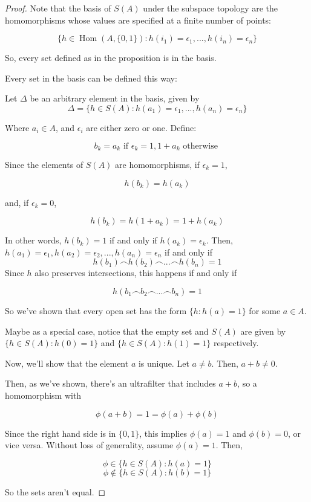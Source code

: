 \documentclass{article}
\DeclareMathOperator{\Hom}{Hom}
\begin{document}
      \begin{proof}
      Note that the basis of $S(A)$ under the subspace topology are the
      homomorphisms whose values are specified at a finite number of points:

        \[\{h \in \Hom(A,\{0,1\}): h(i_1) = \epsilon_1, ... , h(i_n) = \epsilon_n\}\]

      So, every set defined as in the proposition is in the basis.

      Every set in the basis can be defined this way:

      Let $\Delta$ be an arbitrary element in the basis, given by \[\Delta = \{h
      \in S(A) : h(a_1) = \epsilon_1, ... , h(a_n) = \epsilon_n\}\]

      Where $a_i \in A$, and $\epsilon_i$ are either zero or one. Define:

      \[b_k = a_k \text{ if } \epsilon_k = 1, 1+a_k \text{ otherwise }\]

      Since the
      elements of $S(A)$ are homomorphisms, if $\epsilon_k = 1$,

      \[h(b_k) = h(a_k)\]

      and, if $\epsilon_k = 0$,

      \[h(b_k) = h(1+a_k) = 1+h(a_k)\]

      In other words, $h(b_k) = 1$ if and only if $h(a_k) = \epsilon_k$. Then,
      $h(a_1) = \epsilon_1, h(a_2) = \epsilon_2, ..., h(a_n) = \epsilon_n$ if and
      only if \[h(b_1) \frown h(b_2) \frown ... \frown h(b_n) = 1\] Since $h$
      also preserves intersections, this happens if and only if

      \[h(b_1 \frown b_2 \frown ... \frown b_n) = 1\]

      So we've shown that every open set has the form $\{h : h(a) = 1\}$ for some
      $a \in A$.

      Maybe as a special case, notice that the empty set and $S(A)$ are given by
      $\{h \in S(A) : h(0) = 1\}$ and $\{h \in S(A) : h(1) = 1\}$ respectively.

      Now, we'll show that the element $a$ is unique. Let $a \neq b$. Then, $a+b
      \neq 0$.

      Then, as we've shown, there's an ultrafilter that includes $a+b$, so a
      homomorphism with

      \[\phi(a+b) = 1 = \phi(a) + \phi(b)\]

      Since the right hand side is in $\{0,1\}$, this implies $\phi(a) = 1$ and
      $\phi(b) = 0$, or vice versa. Without loss of generality, assume $\phi(a)
      = 1$. Then,

      \[\phi \in \{h \in S(A): h(a) = 1\}\] \[\phi \notin \{h \in S(A) : h(b) =
      1\}\]

      So the sets aren't equal.
      \end{proof}
\end{document}
